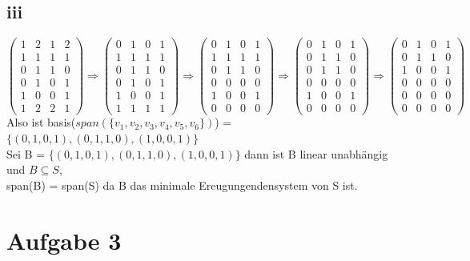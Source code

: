 \documentclass[10pt,a4paper]{article}
\begin{document}
 \subsection{iii}
 \begin{equation*}
 \begin{pmatrix}
 1&2&1&2 \\ 1&1&1&1 \\ 0&1&1&0 \\ 0&1&0&1 \\ 1&0&0&1 \\ 1&2&2&1 
 \end{pmatrix} \Rightarrow
 \begin{pmatrix}
 0&1&0&1 \\ 1&1&1&1 \\ 0&1&1&0 \\ 0&1&0&1 \\ 1&0&0&1 \\ 1&1&1&1 
 \end{pmatrix} \Rightarrow
 \begin{pmatrix}
 0&1&0&1 \\ 1&1&1&1 \\ 0&1&1&0 \\ 0&0&0&0 \\ 1&0&0&1 \\ 0&0&0&0 
 \end{pmatrix} \Rightarrow
 \begin{pmatrix}
 0&1&0&1 \\ 0&1&1&0 \\ 0&1&1&0 \\ 0&0&0&0 \\ 1&0&0&1 \\ 0&0&0&0 
 \end{pmatrix} \Rightarrow
 \begin{pmatrix}
 0&1&0&1 \\ 0&1&1&0 \\ 1&0&0&1 \\ 0&0&0&0 \\ 0&0&0&0 \\ 0&0&0&0 
 \end{pmatrix} 
 \end{equation*}
 Also ist basis($span(\{v_1,v_2,v_3,v_4,v_5,v_6\}) $) = $ \{(0,1,0,1),(0,1,1,0),(1,0,0,1)\} $\\
 Sei B =  $ \{(0,1,0,1),(0,1,1,0),(1,0,0,1)\} $ dann ist B linear unabhängig und $B \subseteq S$,\\
 span(B) = span(S) da B das minimale Ereugungendensystem von S ist.
 \section{Aufgabe 3}
\end{document}
